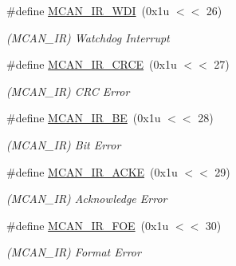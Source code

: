 \begin{DoxyCompactItemize}
\mbox{\label{group__SAMV71__MCAN_gacddac7de39f6a6950ae3c88a7cf10ed4}} 
\#define \mbox{\hyperlink{group__SAMV71__MCAN_gacddac7de39f6a6950ae3c88a7cf10ed4}{M\+C\+A\+N\+\_\+\+I\+R\+\_\+\+W\+DI}}~(0x1u $<$$<$ 26)
\begin{DoxyCompactList}\small\item\em (M\+C\+A\+N\+\_\+\+IR) Watchdog Interrupt \end{DoxyCompactList}\item 
\mbox{\label{group__SAMV71__MCAN_gaf094030b971b110bdbc9ad3a412caa08}} 
\#define \mbox{\hyperlink{group__SAMV71__MCAN_gaf094030b971b110bdbc9ad3a412caa08}{M\+C\+A\+N\+\_\+\+I\+R\+\_\+\+C\+R\+CE}}~(0x1u $<$$<$ 27)
\begin{DoxyCompactList}\small\item\em (M\+C\+A\+N\+\_\+\+IR) C\+RC Error \end{DoxyCompactList}\item 
\mbox{\label{group__SAMV71__MCAN_ga9430656b360511ed86f8d3bd80a64e75}} 
\#define \mbox{\hyperlink{group__SAMV71__MCAN_ga9430656b360511ed86f8d3bd80a64e75}{M\+C\+A\+N\+\_\+\+I\+R\+\_\+\+BE}}~(0x1u $<$$<$ 28)
\begin{DoxyCompactList}\small\item\em (M\+C\+A\+N\+\_\+\+IR) Bit Error \end{DoxyCompactList}\item 
\mbox{\label{group__SAMV71__MCAN_ga64633020fb048c6f0078ac8a5934739d}} 
\#define \mbox{\hyperlink{group__SAMV71__MCAN_ga64633020fb048c6f0078ac8a5934739d}{M\+C\+A\+N\+\_\+\+I\+R\+\_\+\+A\+C\+KE}}~(0x1u $<$$<$ 29)
\begin{DoxyCompactList}\small\item\em (M\+C\+A\+N\+\_\+\+IR) Acknowledge Error \end{DoxyCompactList}\item 
\mbox{\label{group__SAMV71__MCAN_ga9eebc9c684fa1cf2a0af6b90cd50d9a7}} 
\#define \mbox{\hyperlink{group__SAMV71__MCAN_ga9eebc9c684fa1cf2a0af6b90cd50d9a7}{M\+C\+A\+N\+\_\+\+I\+R\+\_\+\+F\+OE}}~(0x1u $<$$<$ 30)
\begin{DoxyCompactList}\small\item\em (M\+C\+A\+N\+\_\+\+IR) Format Error \end{DoxyCompactList}\item 
$$
\end{DoxyCompactItemize}
